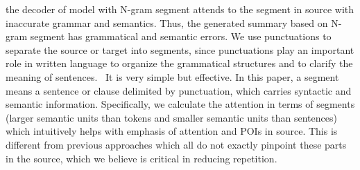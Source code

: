 the decoder of model with N-gram segment attends to the segment in source with inaccurate grammar and semantics.
Thus, the generated summary based on N-gram segment has grammatical and semantic errors.
We use punctuations to separate the source or target into segments,
since punctuations play an important role in written language to organize
the grammatical structures and to clarify the meaning of sentences.~\citep{briscoe1996,Kim19,LiWE19}
It is very simple but effective. 
In this paper, a segment means 
a sentence or clause delimited by punctuation,
which carries syntactic and semantic information. 
Specifically, we calculate the attention in terms of segments 
(larger semantic units than tokens and smaller semantic units than sentences)
which intuitively helps with emphasis of attention and POIs in source.
This is different from previous approaches
which all do not exactly pinpoint these parts in the source,
which we believe is critical in reducing repetition. 

